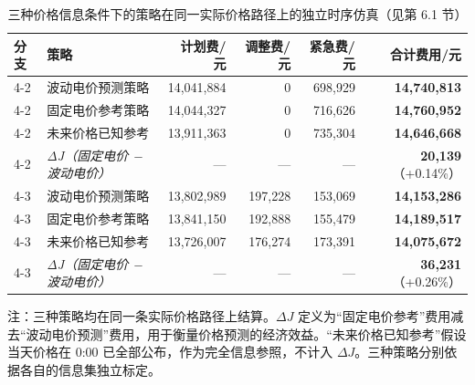 \begin{table}[htbp]
  \centering
  \caption{三种价格信息条件下的策略在同一实际价格路径上的独立时序仿真（见第 6.1 节）}
  \label{tab:p4-strategy}
  \small
  \begin{tabular}{llrrrr}
    \toprule
    分支 & 策略 & 计划费/元 & 调整费/元 & 紧急费/元 & 合计费用/元 \\
    \midrule
    4-2 & 波动电价预测策略 & 14,041,884 & 0 & 698,929 & \textbf{14,740,813} \\
    4-2 & 固定电价参考策略 & 14,044,327 & 0 & 716,626 & \textbf{14,760,952} \\
    4-2 & 未来价格已知参考 & 13,911,363 & 0 & 735,304 & \textbf{14,646,668} \\
    \midrule
    4-2 & \textit{ΔJ（固定电价 − 波动电价）} & --- & --- & --- & \textbf{20,139}（+0.14\%） \\
    4-3 & 波动电价预测策略 & 13,802,989 & 197,228 & 153,069 & \textbf{14,153,286} \\
    4-3 & 固定电价参考策略 & 13,841,150 & 192,888 & 155,479 & \textbf{14,189,517} \\
    4-3 & 未来价格已知参考 & 13,726,007 & 176,274 & 173,391 & \textbf{14,075,672} \\
    \midrule
    4-3 & \textit{ΔJ（固定电价 − 波动电价）} & --- & --- & --- & \textbf{36,231}（+0.26\%） \\
    \bottomrule
  \end{tabular}
  \par\vspace{2pt}
  \begin{minipage}{\textwidth}\footnotesize
    注：三种策略均在同一条实际价格路径上结算。$\Delta J$ 定义为“固定电价参考”费用减去“波动电价预测”费用，用于衡量价格预测的经济效益。“未来价格已知参考”假设当天价格在 0:00 已全部公布，作为完全信息参照，不计入 $\Delta J$。三种策略分别依据各自的信息集独立标定。
  \end{minipage}
\end{table}

